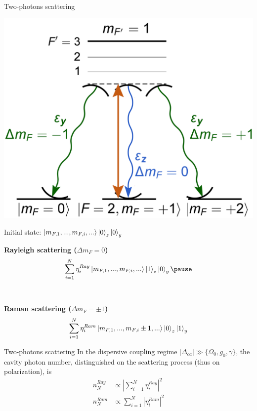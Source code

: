 \documentclass{beamer}
\begin{document}
\begin{frame}{Two-photons scattering}
	\begin{minipage}{0.4\textwidth}
		\centering
		\includegraphics[width=\textwidth]{Figure_scattering_types.png}
	\end{minipage}
	\hfill
	\begin{minipage}{0.55\textwidth}
		\begin{center}
			Initial state: $\ket{m_{F,1},...,m_{F,i},...}\ket{0}_z\ket{0}_y$\pause
		\end{center}
		\vspace{2em}
		\textbf{Rayleigh scattering ($\Delta m_F=0$)}\\
		\vspace{-0.7em}
		\begin{equation*}
			\sum_{i=1}^N \eta^{Ray}_i\ket{m_{F,1},...,m_{F,i},...}\ket{1}_z\ket{0}_y\pause
		\end{equation*}\\~\\
		\textbf{Raman scattering ($\Delta m_F=\pm1$)}\\
		\vspace{-0.7em}
		\begin{equation*}
			\sum_{i=1}^N \eta^{Ram}_i\ket{m_{F,1},...,m_{F,i}\pm1,...}\ket{0}_z\ket{1}_y
		\end{equation*}
	\end{minipage}
\end{frame}

\begin{frame}{Two-photons scattering}
	In the dispersive coupling regime $|\Delta_{ca}|\gg\{\Omega_0,g_0,\gamma\}$, the cavity photon number, distinguished on the scattering process (thus on polarization), is
	\begin{align*}
		n^{Ray}_N &\propto |\sum_{i=1}^N \eta^{Ray}_i|^2\\
		n^{Ram}_N &\propto \sum_{i=1}^N |\eta^{Ram}_i|^2
	\end{align*}
\end{frame}
\end{document}
